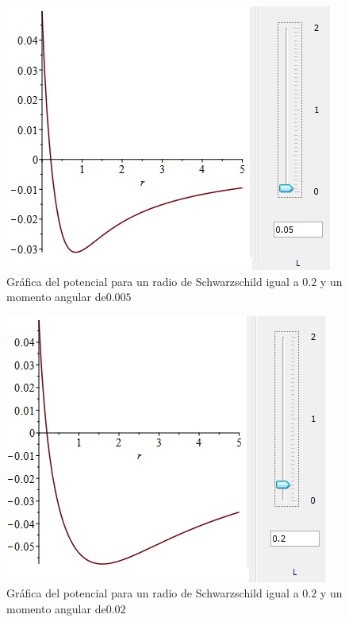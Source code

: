 \documentclass{article}
\begin{document}
\begin{figure}[H]
\centering
\includegraphics[scale=0.7]{rs=02,L=005.jpg}  \caption{Gráfica del potencial para un radio de Schwarzschild igual a $0.2$ y un momento angular de$0.005$}\label{005}
\end{figure}

\begin{figure}[H]
\centering
\includegraphics[scale=0.7]{rs=02,L=02.jpg}  \caption{Gráfica del potencial para un radio de Schwarzschild igual a $0.2$ y un momento angular de$0.02$}\label{02}
\end{figure}
\end{document}
